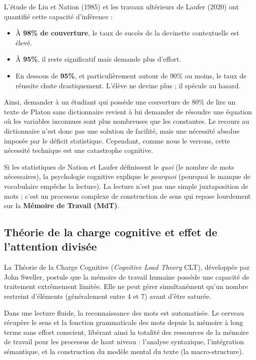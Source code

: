 {L'étude de Liu et Nation (1985) et les travaux ultérieurs de Laufer (2020) ont quantifié cette
capacité d'inférence :

\begin{itemize}\item À \textbf{98\% de couverture}, le taux de succès de la devinette contextuelle est élevé.\item À \textbf{95\%}, il reste significatif mais demande plus d'effort.\item En dessous de \textbf{95\%}, et particulièrement autour de 90\% ou moins, le taux de réussite chute drastiquement. L'élève ne \og devine\fg{} plus ; il spécule au hasard.\cite{II-3-2-ref13}\end{itemize}Ainsi, demander à un étudiant qui possède une couverture de 80\% de \og lire\fg{} un texte de Platon
sans dictionnaire revient à lui demander de résoudre une équation où les variables inconnues sont
plus nombreuses que les constantes. Le recours au dictionnaire n'est donc pas une solution de
facilité, mais une nécessité absolue imposée par le déficit statistique. Cependant, comme nous le
verrons, cette nécessité technique est une catastrophe cognitive.

Si les statistiques de Nation et Laufer définissent le \textit{quoi} (le nombre de mots
nécessaires), la psychologie cognitive explique le \textit{pourquoi} (pourquoi le manque de
vocabulaire empêche la lecture). La lecture n'est pas une simple juxtaposition de mots ; c'est un
processus complexe de construction de sens qui repose lourdement sur la \textbf{Mémoire de Travail
(MdT)}.



\subsection{Théorie de la charge cognitive et effet de l'attention divisée}

La Théorie de la Charge Cognitive (\textit{Cognitive Load Theory} \- CLT), développée par John
Sweller, postule que la mémoire de travail humaine possède une capacité de traitement extrêmement
limitée. Elle ne peut gérer simultanément qu'un nombre restreint d'éléments (généralement entre 4 et
7) avant d'être saturée.\cite{II-3-2-ref15}

Dans une lecture fluide, la reconnaissance des mots est automatisée. Le cerveau récupère le sens et
la fonction grammaticale des mots depuis la mémoire à long terme sans effort conscient, libérant
ainsi la totalité des ressources de la mémoire de travail pour les processus de haut niveau :
l'analyse syntaxique, l'intégration sémantique, et la construction du modèle mental du texte (la
macro-structure).\cite{II-3-2-ref17}

}
